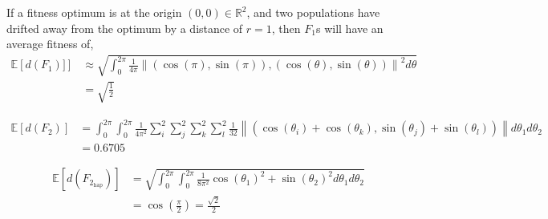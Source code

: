 \documentclass{article}
\newcommand{\R}{\mathbb{R}}
\newcommand{\1}{\mathbbm{1}}
\newcommand{\fit}{\mathcal{F}}
\begin{document}
If a fitness optimum is at the origin $(0,0) \in \R^{2}$,
and two populations have drifted away from the optimum by a distance of $r=1$,
then $F_1$s will have an average fitness of,
  \begin{align*}
    \mathbb{E} \left[ d(F_1)] \right] &\approx \sqrt{\int_{0}^{2\pi} \frac{1}{4 \pi}\left\lVert  \left( \cos(\pi), \sin(\pi) \right) , \left( \cos(\theta), \sin(\theta) \right) \right\rVert^2 d\theta} \\
    &= \sqrt{\frac{1}{2}}
  \end{align*}

  \begin{align*}
    \mathbb{E} \left[ d(F_2) \right] &= \int_{0}^{2 \pi} \int_{0}^{2 \pi} \frac{1}{4 \pi^{2}} \sum_{i}^{2} \sum_{j}^{2} \sum_{k}^{2} \sum_{l}^{2} \frac{1}{32} \left\lVert \left( \cos(\theta_i) + \cos(\theta_k), \sin(\theta_j) + \sin(\theta_l) \right) \right\rVert d\theta_1 d\theta_2 \\ &= 0.6705
  \end{align*}

  \begin{align*}
    \mathbb{E}\left[ d(F_{2_{\text{hap}}}) \right] &= \sqrt{\int_{0}^{2 \pi} \int_{0}^{2 \pi} \frac{1}{8 \pi^{2}} \cos(\theta_1)^{2} + \sin(\theta_2)^{2} d\theta_1 d\theta_2} \\
    &= \cos \left( \frac{\pi}{2} \right) = \frac{\sqrt{2}}{2}
  \end{align*}

\end{document}
